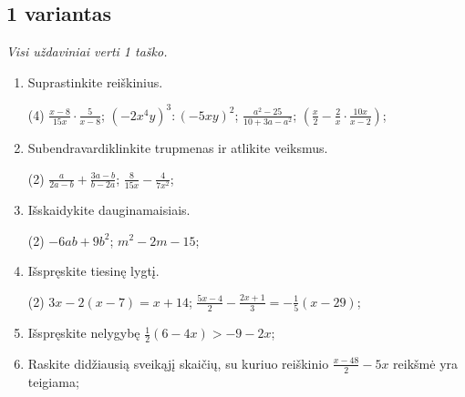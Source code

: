 \documentclass[a4paper]{article}
\begin{document}
\subsection*{1 variantas}

\textit{Visi uždaviniai verti 1 taško.}


\begin{enumerate}
      \item Suprastinkite reiškinius.
            \begin{tasks}[item-format={\normalfont}, after-item-skip=2mm](4)
                  \task $\frac{x-8}{15x}\cdot \frac{5}{x-8}$;
                  \task $(-2x^4y)^3:(-5xy)^2$;
                  \task $\frac{a^2-25}{10+3a-a^2}$;
                  \task $(\frac{x}{2}-\frac{2}{x}\cdot \frac{10x}{x-2})$;
            \end{tasks}

      \item Subendravardiklinkite trupmenas ir atlikite veiksmus.
            \begin{tasks}[item-format={\normalfont}, after-item-skip=2mm](2)
                  \task $\frac{a}{2a-b}+\frac{3a-b}{b-2a}$;
                  \task $\frac{8}{15x}-\frac{4}{7x^2}$;
            \end{tasks}

      \item Išskaidykite dauginamaisiais.
            \begin{tasks}[item-format={\normalfont}, after-item-skip=2mm](2)
                  \task $-6ab+9b^2$;
                  \task $m^2-2m-15$;
            \end{tasks}

      \item Išspręskite tiesinę lygtį.
            \begin{tasks}[item-format={\normalfont}, after-item-skip=2mm](2)
                  \task $3x-2(x-7)=x+14$;
                  \task $\frac{5x-4}{2}-\frac{2x+1}{3}=-\frac{1}{5}(x-29)$;
            \end{tasks}

      \item Išspręskite nelygybę $\frac{1}{2}(6-4x)>-9-2x$;
      \item Raskite didžiausią sveikąjį skaičių, su kuriuo reiškinio $\frac{x-48}{2}-5x$
            reikšmė yra teigiama;
\end{enumerate}
\end{document}
